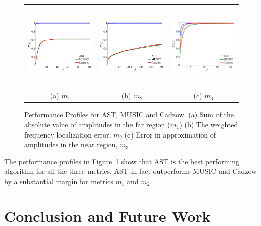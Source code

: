 \begin{figure}[htp]
\begin{tabular}{ccc}
	\includegraphics[height=42mm]{figures/m1_pp.pdf} &
	\includegraphics[height=42mm]{figures/m2_pp.pdf} &
	\includegraphics[height=42mm]{figures/m3_pp.pdf}\\
	(a) $m_1$ & (b) $m_2$ & (c) $m_3$
\end{tabular}
\caption{ Performance Profiles for AST, MUSIC and Cadzow.
(a) Sum of the absolute value of amplitudes in the far region ($m_1$)
(b) The weighted frequency localization error, $m_2$
(c) Error in approximation of amplitudes in the near region, $m_3$ }
\label{fig:pp}
\end{figure}

The performance profiles in Figure~\ref{fig:pp} show that AST is the best
performing algorithm for all the three metrics.  AST in fact outperforms
MUSIC and Cadzow by a substantial margin for metrics $m_1$ and $m_2$. 


\section{Conclusion and Future Work}\label{sec:conclusions}


